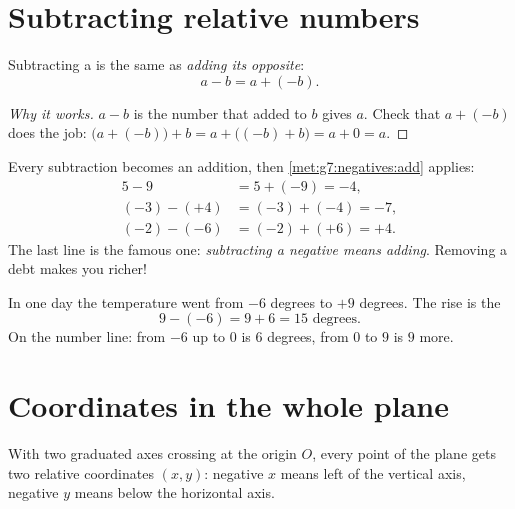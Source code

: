 \section{Subtracting relative numbers}

\begin{theorem}\label{thm:g7:negatives:sub}
Subtracting a  is the same as \emph{adding its
opposite}:
\[
a - b = a + (-b) .
\]
\end{theorem}

\begin{proof}[Why it works]
$a - b$ is the number that added to $b$ gives $a$. Check that
$a + (-b)$ does the job:
$\bigl(a + (-b)\bigr) + b = a + \bigl((-b) + b\bigr) = a + 0 = a$.
\end{proof}

\begin{example}\label{ex:g7:negatives:sub}
Every subtraction becomes an addition, then
\cref{met:g7:negatives:add} applies:
\begin{align*}
5 - 9 &= 5 + (-9) = -4, \\
(-3) - (+4) &= (-3) + (-4) = -7, \\
(-2) - (-6) &= (-2) + (+6) = +4 .
\end{align*}
The last line is the famous one: \emph{subtracting a negative means
adding}. Removing a debt makes you richer!
\end{example}

\begin{example}\label{ex:g7:negatives:temperature}
In one day the temperature went from $-6$ degrees to $+9$ degrees. The
rise is the 
\[
9 - (-6) = 9 + 6 = 15 \text{ degrees}.
\]
On the number line: from $-6$ up to $0$ is $6$ degrees, from $0$ to
$9$ is $9$ more.
\end{example}

\section{Coordinates in the whole plane}

\begin{definition}\label{def:g7:negatives:coords}
With two  graduated axes crossing at the origin $O$,
every point of the plane gets two relative coordinates $(x, y)$:
negative $x$ means left of the vertical axis, negative $y$ means below
the horizontal axis.
\end{definition}

